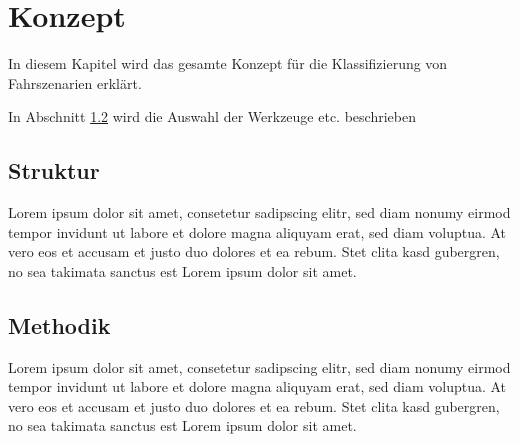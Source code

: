 
\chapter{Konzept}
\label{konzept}

In diesem Kapitel wird das gesamte Konzept für die Klassifizierung von Fahrszenarien erklärt.

In Abschnitt \ref{konzept_methodik} wird die Auswahl der Werkzeuge etc. beschrieben


\section{Struktur}
\label{konzept_struktur}

Lorem ipsum dolor sit amet, consetetur sadipscing elitr, sed diam nonumy eirmod tempor invidunt ut labore et dolore magna aliquyam erat, sed diam voluptua. At vero eos et accusam et justo duo dolores et ea rebum. Stet clita kasd gubergren, no sea takimata sanctus est Lorem ipsum dolor sit amet.  


\section{Methodik}
\label{konzept_methodik}

Lorem ipsum dolor sit amet, consetetur sadipscing elitr, sed diam nonumy eirmod tempor invidunt ut labore et dolore magna aliquyam erat, sed diam voluptua. At vero eos et accusam et justo duo dolores et ea rebum. Stet clita kasd gubergren, no sea takimata sanctus est Lorem ipsum dolor sit amet.  